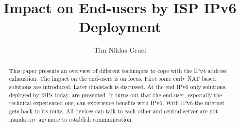 \documentclass[format=sigconf, natbib=true, nonacm=true]{acmart}
\begin{document}
    \title{Impact on End-users by ISP IPv6 Deployment}

    \author{Tim Niklas Gruel}

    \begin{abstract}
        This paper presents an overview of different techniques to cope with the IPv4 address exhaustion. The impact on the end-users is on focus. First some early NAT based solutions are introduced. Later dualstack is discussed. At the end IPv6 only solutions, deployed by ISPs today, are presented. It turns out that the end-user, especially the technical experienced one, can experience benefits with IPv6. With IPv6 the internet gets back to its routs. All devices can talk to each other and central server are not mandatory anymore to establish communication.
    \end{abstract}



    \maketitle
\end{document}
